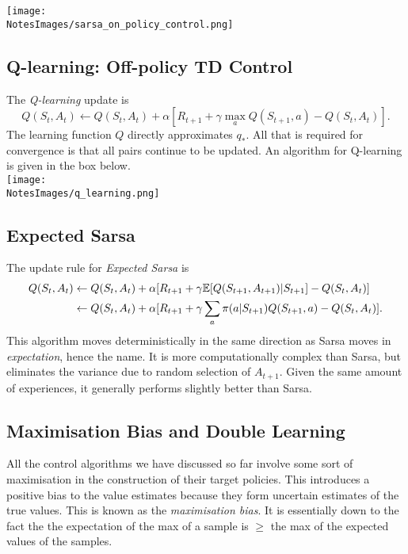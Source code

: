 \texttt{[image: \\NotesImages/sarsa\_on\_policy\_control.png]} \\

\subsection{Q-learning: Off-policy TD Control}
The \emph{Q-learning} update is 
\begin{equation}
    Q(S_t, A_t) \leftarrow Q(S_t, A_t) + \alpha [R_{t+1} + \gamma \max_a Q(S_{t+1}, a) - Q(S_t, A_t)].
\end{equation}
The learning function $Q$ directly approximates $q_*$. All that is required for convergence is that all pairs continue to be updated. An algorithm for Q-learning is given in the box below. \\

\texttt{[image: \\NotesImages/q\_learning.png]}\\

\subsection{Expected Sarsa}
The update rule for \emph{Expected Sarsa} is 
\begin{align}
        Q(S_t, A_t) & \leftarrow Q(S_t, A_t) + \alpha [R_{t+1} + \gamma \mathbb{E}{}[Q(S_{t+1}, A_{t+1})|S_{t+1}] - Q(S_t, A_t)] \\
                    & \leftarrow Q(S_t, A_t) + \alpha [R_{t+1} + \gamma \sum_a \pi(a|S_{t+1}) Q(S_{t+1}, a) - Q(S_t, A_t)].
\end{align}
This algorithm moves deterministically in the same direction as Sarsa moves in \emph{expectation}, hence the name. It is more computationally complex than Sarsa, but eliminates the variance due to random selection of $A_{t+1}$. Given the same amount of experiences, it generally performs slightly better than Sarsa.

\subsection{Maximisation Bias and Double Learning}
All the control algorithms we have discussed so far involve some sort of maximisation in the construction of their target policies. This introduces a positive bias to the value estimates because they form uncertain estimates of the true values. This is known as the \emph{maximisation bias}. It is essentially down to the fact the the expectation of the max of a sample is $\geq$ the max of the expected values of the samples.\\

